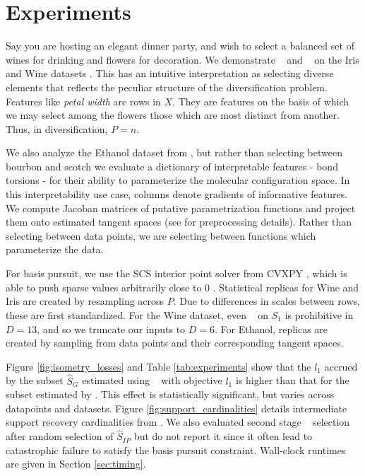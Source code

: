 \section{Experiments}
\label{sec:experiments}

Say you are hosting an elegant dinner party, and wish to select a balanced set of wines for drinking and flowers for decoration.
We demonstrate \tsip~ and \greedy~ on the Iris and Wine datasets \citep{misc_iris_53, misc_wine_109, scikit-learn}.
This has an intuitive interpretation as selecting diverse elements that reflects the peculiar structure of the diversification problem.
Features like \textit{ petal width} are rows in $X$.
They are features on the basis of which we may select among the flowers those which are most distinct from another.
Thus, in diversification, $P = n$.

We also analyze the Ethanol dataset from \citet{Chmiela2018-at, Koelle2022-ju}, but rather than selecting between bourbon and scotch we evaluate a dictionary of interpretable features  - bond torsions - for their ability to parameterize the molecular configuration space.
In this interpretability use case, columns denote gradients of informative features.
We compute Jacoban matrices of putative parametrization functions and project them onto estimated tangent spaces (see \citet{Koelle2022-ju} for preprocessing details).
Rather than selecting between data points, we are selecting between functions which parameterize the data.

For basis pursuit, we use the SCS interior point solver \citep{ocpb:16} from CVXPY \citep{diamond2016cvxpy, agrawal2018rewriting}, which is able to push sparse values arbitrarily close to 0 \citep{cvxpy_sparse_solution}.
Statistical replicas for Wine and Iris are created by resampling across $P$.
Due to differences in scales between rows, these are first standardized.
For the Wine dataset, even \brute~ on $\widehat {S}_1$ is prohibitive in $D=13$, and so we truncate our inputs to $D=6$.
For Ethanol, replicas are created by sampling from data points and their corresponding tangent spaces.

Figure \ref{fig:isometry_losses} and Table \ref{tab:experiments} show that the $l_1$ accrued by the subset $\widehat S_{G}$ estimated using \greedy~ with objective $l_1$ is higher than that for the subset estimated by \tsip.
This effect is statistically significant, but varies across datapoints and datasets.
Figure \ref{fig:support_cardinalities} details intermediate support recovery cardinalities from \isometrypursuit.
We also evaluated second stage \brute~ selection after random selection of $\widehat S_{IP}$ but do not report it since it often lead to catastrophic failure to satisfy the basis pursuit constraint.
Wall-clock runtimes are given in Section \ref{sec:timing}.

